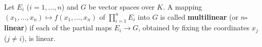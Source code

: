 Let $E_i$ ($i = 1, \ldots, n$) and $G$ be vector spaces over $K$. A mapping $(x_1, \ldots, x_n) \mapsto f(x_1, \ldots, x_n)$ of $\prod_{i=1}^{n} E_i$ into $G$ is called \textbf{multilinear} (or \textbf{$n$-linear}) if each of the partial maps $E_i \to G$, obtained by fixing the coordinates $x_j$ ($j \neq i$), is linear.
